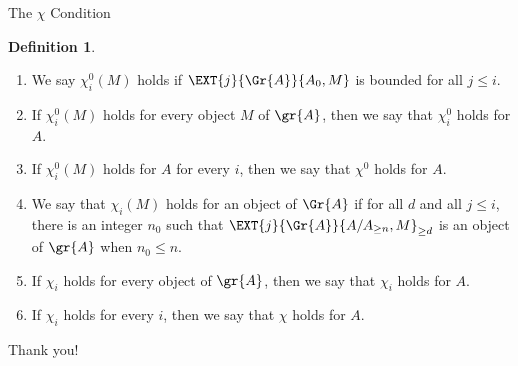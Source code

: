 \documentclass{beamer}
\theoremstyle{definition}
\newtheorem{defn}{Definition}
\begin{document}
\begin{frame}{The $\chi$ Condition}
  \setcounter{defn}{6}
  \begin{defn}
    \begin{enumerate}
    \item
      We say $\chi_i^0(M)$ holds if $\EXT{j}{\Gr{A}}{A_0, M}$ is bounded for all $j \leq i$.
    \item
      If $\chi^0_i(M)$ holds for every object $M$ of $\gr{A}$, then we say that $\chi^0_i$ holds for $A$.
    \item
      If $\chi^0_i(M)$ holds for $A$ for every $i$, then we say that $\chi^0$ holds for $A$.
    \item
      We say that $\chi_i(M)$ holds for an object of $\Gr{A}$ if for all $d$ and all $j \leq i$, there is an integer $n_0$ such that $\EXT{j}{\Gr{A}}{A/A_{\geq n}, M}_{\geq d}$ is an object of $\gr{A}$ when $n_0 \leq n$.
    \item
      If $\chi_i$ holds for every object of $\gr{A}$, then we say that $\chi_i$ holds for $A$.
    \item
      If $\chi_i$ holds for every $i$, then we say that $\chi$ holds for $A$.
    \end{enumerate}
  \end{defn}
\end{frame}

\begin{frame}
\begin{center}
Thank you!
\end{center}
\end{frame}
\end{document}
